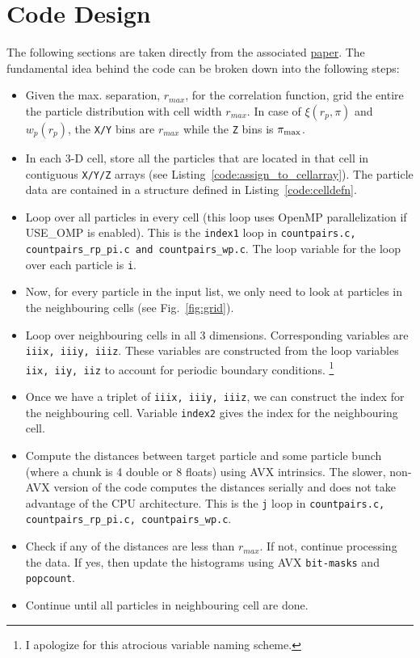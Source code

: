 \documentclass[12pt,titlepage]{article}
\let\stdsection\section
\newcommand{\rmax}{\ensuremath{{r_{max}}}\xspace}
\newcommand{\wprp}{\ensuremath{{w_p(r_p)}}\xspace}
\newcommand{\xirppi}{\ensuremath{{\xi(r_p,\pi)}}\xspace}
\newcommand{\pimax}{\ensuremath{{\pi_{\rm max}}}\xspace}
\begin{document}
\stdsection{Code Design}
The following sections are taken directly from the associated \href{valid arXiv link}{paper}. The fundamental idea 
behind the code can be broken down into the following steps:
\begin{itemize}
\item Given the max. separation, \rmax, for the correlation function, grid the entire the particle distribution with cell width \rmax. In case of 
\xirppi and \wprp, the \texttt{X/Y} bins are \rmax while the \texttt{Z} bins is \pimax.
\item In each 3-D cell, store all the particles that are located in that cell in contiguous \texttt{X/Y/Z} arrays (see Listing~\ref{code:assign_to_cellarray}). The particle data are contained in a structure 
defined in Listing~\ref{code:celldefn}.
\item Loop over all particles in every cell (this loop uses OpenMP parallelization if USE\_OMP is enabled). This is the \texttt{index1} loop in 
\texttt{countpairs.c, countpairs\_rp\_pi.c and countpairs\_wp.c}. The loop variable for the loop over each particle is \texttt{i}.
\item Now, for every particle in the input list, we only need to look at particles in the neighbouring cells (see Fig.~\ref{fig:grid}). 
\item Loop over neighbouring cells in all 3 dimensions. Corresponding variables are \texttt{iiix, iiiy, iiiz}. These variables are constructed from the 
loop variables \texttt{iix, iiy, iiz} to account for periodic boundary conditions. \footnote{I apologize for this atrocious variable naming scheme.}
\item Once we have a triplet of \texttt{iiix, iiiy, iiiz}, we can construct the index for the neighbouring cell. Variable \texttt{index2} gives the index 
for the neighbouring cell. 
\item Compute the distances between target particle and some particle bunch (where a chunk is 4 double or 8 floats) using AVX intrinsics. The slower, non-AVX 
version of the code computes the distances serially and does not take advantage of the CPU architecture. This is the \texttt{j} loop in 
\texttt{countpairs.c, countpairs\_rp\_pi.c, countpairs\_wp.c}. 
\item Check if any of the distances are less than \rmax. If not, continue processing the data. If yes, then update the histograms using 
AVX \texttt{bit-masks} and \texttt{popcount}. 
\item Continue until all particles in neighbouring cell are done. 
\end{itemize}
\end{document}
